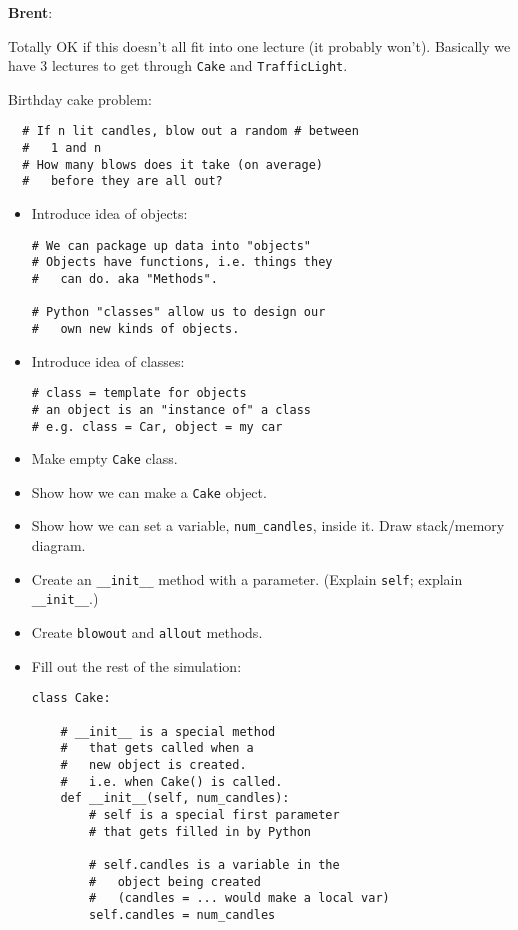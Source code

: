 \documentclass{article}
\newenvironment{reflect}[1]
{
  \noindent
  \begin{lrbox}{\reflectbox}
    \begin{minipage}[t]{\textwidth}
      \textbf{#1}:
}{
    \end{minipage}
  \end{lrbox}
  \fbox{\usebox{\reflectbox}}
}
\begin{document}
\begin{reflect}{Brent}
  Totally OK if this doesn't all fit into one lecture (it probably
  won't).  Basically we have 3 lectures to get through \verb|Cake| and
  \verb|TrafficLight|.
\end{reflect}

Birthday cake problem:
\begin{verbatim}
  # If n lit candles, blow out a random # between
  #   1 and n
  # How many blows does it take (on average)
  #   before they are all out?
\end{verbatim}

\begin{itemize}
\item Introduce idea of objects:
\begin{verbatim}
# We can package up data into "objects"
# Objects have functions, i.e. things they
#   can do. aka "Methods".

# Python "classes" allow us to design our
#   own new kinds of objects.
\end{verbatim}
\item Introduce idea of classes:
\begin{verbatim}
# class = template for objects
# an object is an "instance of" a class
# e.g. class = Car, object = my car
\end{verbatim}
\item Make empty \verb|Cake| class.
\item Show how we can make a \verb|Cake| object.
\item Show how we can set a variable, \verb|num_candles|, inside it.
  Draw stack/memory diagram.
\item Create an \verb|__init__| method with a parameter. (Explain
  \verb|self|; explain \verb|__init__|.)
\item Create \verb|blowout| and \verb|allout| methods.
\item Fill out the rest of the simulation:
\begin{verbatim}
class Cake:

    # __init__ is a special method
    #   that gets called when a
    #   new object is created.
    #   i.e. when Cake() is called.
    def __init__(self, num_candles):
        # self is a special first parameter
        # that gets filled in by Python

        # self.candles is a variable in the
        #   object being created
        #   (candles = ... would make a local var)
        self.candles = num_candles


\end{verbatim}
\end{itemize}
\end{document}
